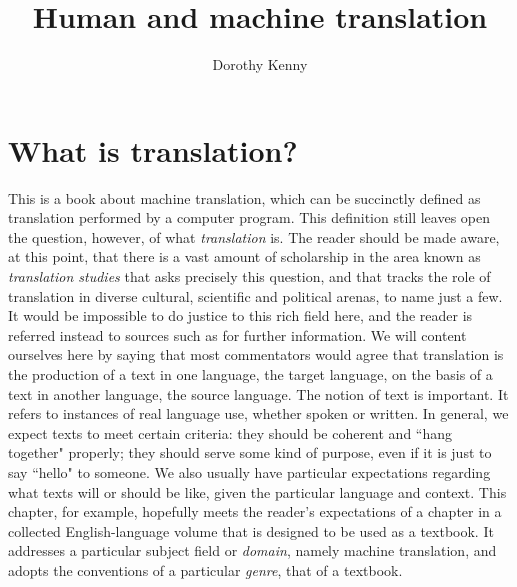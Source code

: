 \documentclass[output=paper]{langscibook}
\author{Dorothy Kenny\orcid{0000-0002-4793-9256}\affiliation{Dublin City University}}
\title{Human and machine translation}
\begin{document}
\maketitle

\section{What is translation?}\label{sec:kenny:1}
This is a book about machine translation, which can be succinctly defined as translation performed by a computer program. This definition still leaves open the question, however, of what \emph{translation} is. The reader should be made aware, at this point, that there is a vast amount of scholarship in the area known as \textit{translation studies} that asks precisely this question, and that tracks the role of translation in diverse cultural, scientific and political arenas, to name just a few. It would be impossible to do justice to this rich field here, and the reader is referred instead to sources such as \citet{Baker2020} for further information. We will content ourselves here by saying that most commentators would agree that translation is the production of a text in one language, the target language, on the basis of a text in another language, the source language. The notion of text is important. It refers to instances of real language use, whether spoken or written. In general, we expect texts to meet certain criteria: they should be coherent and “hang together" properly; they should serve some kind of purpose, even if it is just to say “hello" to someone. We also usually have particular expectations regarding what texts will or should be like, given the particular language and context. This chapter, for example, hopefully meets the reader's expectations of a chapter in a collected English-language volume that is designed to be used as a textbook. It addresses a particular subject field or \emph{domain}, namely machine translation, and adopts the conventions of a particular \emph{genre}, that of a textbook.
\end{document}
